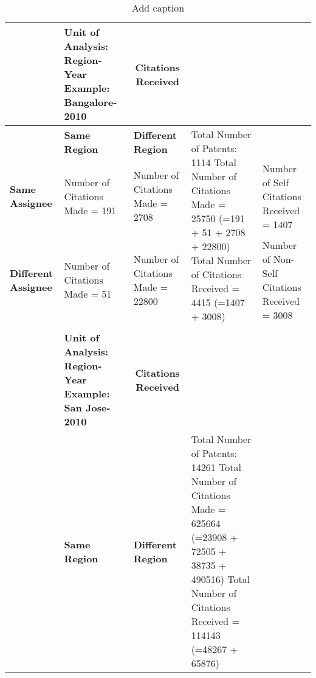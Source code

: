 \begin{table}[htbp]
  \centering
  \caption{Add caption}
    \begin{tabular}{|p{8.085em}|p{8.335em}|p{8.665em}|l|l|}
    \toprule
    \rowcolor[rgb]{ .867,  .922,  .969} \multicolumn{3}{|p{25.085em}|}{\textbf{Citations Made}} & \multicolumn{1}{p{18.75em}|}{\cellcolor[rgb]{ 1,  1,  1}\textbf{Unit of Analysis: Region-Year
Example: Bangalore-2010}} & \multicolumn{1}{c|}{\cellcolor[rgb]{ 1,  .949,  .8}\textbf{Citations Received}} \\
    \midrule
    \rowcolor[rgb]{ .988,  .894,  .839} \multicolumn{1}{|c|}{} & \textbf{Same Region} & \textbf{Different Region} & \multicolumn{1}{l|}{\multirow{3}[6]{*}{\cellcolor[rgb]{ 1,  1,  1}
Total Number of Patents: 1114
Total Number of Citations Made = 25750 (=191 + 51 + 2708 + 22800)
Total Number of Citations Received = 4415 (=1407 + 3008)}} & \cellcolor[rgb]{ 1,  .949,  .8} \\
\cmidrule{1-3}\cmidrule{5-5}    \rowcolor[rgb]{ .988,  .894,  .839} \textbf{Same Assignee} & \cellcolor[rgb]{ .867,  .922,  .969}Number of Citations Made = 191 & \cellcolor[rgb]{ .867,  .922,  .969}Number of Citations Made = 2708  &       & \cellcolor[rgb]{ 1,  .949,  .8}Number of Self Citations Received = 1407 \\
\cmidrule{1-3}\cmidrule{5-5}    \rowcolor[rgb]{ .988,  .894,  .839} \textbf{Different Assignee} & \cellcolor[rgb]{ .867,  .922,  .969}Number of Citations Made = 51 & \cellcolor[rgb]{ .867,  .922,  .969}Number of Citations Made = 22800 &       & \cellcolor[rgb]{ 1,  .949,  .8}Number of Non-Self Citations Received = 3008 \\
    \midrule
    \multicolumn{1}{r}{} & \multicolumn{1}{r}{} & \multicolumn{1}{r}{} & \multicolumn{1}{r}{} & \multicolumn{1}{r}{} \\
    \midrule
    \rowcolor[rgb]{ .867,  .922,  .969} \multicolumn{3}{|p{25.085em}|}{\textbf{Citations Made}} & \multicolumn{1}{p{18.75em}|}{\cellcolor[rgb]{ 1,  1,  1}\textbf{Unit of Analysis: Region-Year
Example: San Jose-2010}} & \multicolumn{1}{c|}{\cellcolor[rgb]{ 1,  .949,  .8}\textbf{Citations Received}} \\
    \midrule
    \rowcolor[rgb]{ .988,  .894,  .839} \multicolumn{1}{|c|}{} & \textbf{Same Region} & \textbf{Different Region} & \multicolumn{1}{l|}{\multirow{3}[6]{*}{\cellcolor[rgb]{ 1,  1,  1}
Total Number of Patents: 14261
Total Number of Citations Made = 625664 (=23908 + 72505 + 38735 + 490516)
Total Number of Citations Received = 114143 (=48267 + 65876)}} & \cellcolor[rgb]{ 1,  .949,  .8} \\

\end{tabular}
\end{table}
